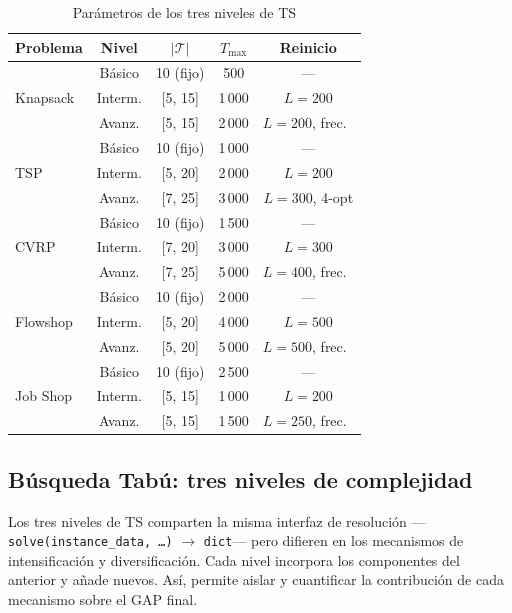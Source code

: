\begin{table}[t]
\caption{Parámetros de los tres niveles de TS}
\label{tab:parametros}
\centering
\footnotesize
\setlength{\tabcolsep}{4pt}
\begin{tabular}{lcccc}
\toprule
\textbf{Problema} & \textbf{Nivel} & $|\mathcal{T}|$ &
  $T_{\max}$ & \textbf{Reinicio} \\
\midrule
\multirow{3}{*}{Knapsack}
  & Básico  & 10 (fijo)   & 500   & ---  \\
  & Interm. & [5, 15]     & 1\,000 & $L=200$  \\
  & Avanz.  & [5, 15]     & 2\,000 & $L=200$, frec.\ \\
\midrule
\multirow{3}{*}{TSP}
  & Básico  & 10 (fijo)   & 1\,000 & ---  \\
  & Interm. & [5, 20]     & 2\,000 & $L=200$  \\
  & Avanz.  & [7, 25]     & 3\,000 & $L=300$, 4-opt \\
\midrule
\multirow{3}{*}{CVRP}
  & Básico  & 10 (fijo)   & 1\,500 & ---  \\
  & Interm. & [7, 20]     & 3\,000 & $L=300$  \\
  & Avanz.  & [7, 25]     & 5\,000 & $L=400$, frec.\ \\
\midrule
\multirow{3}{*}{Flowshop}
  & Básico  & 10 (fijo)   & 2\,000 & ---  \\
  & Interm. & [5, 20]     & 4\,000 & $L=500$  \\
  & Avanz.  & [5, 20]     & 5\,000 & $L=500$, frec.\ \\
\midrule
\multirow{3}{*}{Job Shop}
  & Básico  & 10 (fijo)   & 2\,500 & ---  \\
  & Interm. & [5, 15]     & 1\,000 & $L=200$  \\
  & Avanz.  & [5, 15]     & 1\,500 & $L=250$, frec.\ \\
\bottomrule
\end{tabular}
\end{table}

\subsection{Búsqueda Tabú: tres niveles de complejidad}

Los tres niveles de TS comparten la misma interfaz de resolución
—\texttt{solve(instance\_data, \ldots)} $\to$ \texttt{dict}— pero
difieren en los mecanismos de intensificación y diversificación.
Cada nivel incorpora los componentes del anterior y añade nuevos.
Así, permite aislar y cuantificar la contribución de cada mecanismo
sobre el GAP final.

